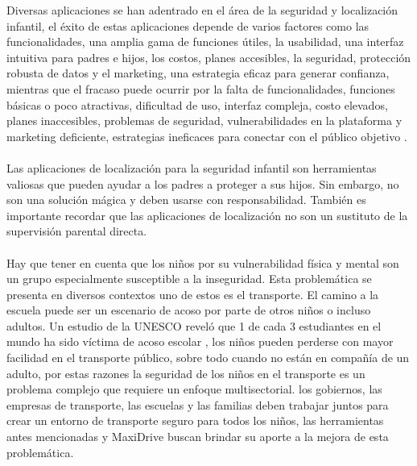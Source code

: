 \documentclass[12pt,onehalfspacing]{report}
\begin{document}
Diversas aplicaciones se han adentrado en el área de la seguridad y localización infantil, el éxito de estas aplicaciones depende de varios factores como las funcionalidades, una amplia gama de funciones útiles, la usabilidad, una interfaz intuitiva para padres e hijos, los costos, planes accesibles, la seguridad, protección robusta de datos y el marketing, una estrategia eficaz para generar confianza, mientras que el fracaso puede ocurrir por la falta de funcionalidades, funciones básicas o poco atractivas, dificultad de uso, interfaz compleja, costo elevados, planes inaccesibles, problemas de seguridad, vulnerabilidades en la plataforma y marketing deficiente, estrategias ineficaces para conectar con el público objetivo \cite{child_safety}.\\\\
Las aplicaciones de localización para la seguridad infantil son herramientas valiosas que pueden ayudar a los padres a proteger a sus hijos. Sin embargo, no son una solución mágica y deben usarse con responsabilidad. También es importante recordar que las aplicaciones de localización no son un sustituto de la supervisión parental directa.\\\\
Hay que tener en cuenta que los niños por su vulnerabilidad física y mental son un grupo especialmente susceptible a la inseguridad. Esta problemática se presenta en diversos contextos uno de estos es el transporte. El camino a la escuela puede ser un escenario de acoso por parte de otros niños o incluso adultos. Un estudio de la UNESCO reveló que 1 de cada 3 estudiantes en el mundo ha sido víctima de acoso escolar \cite{unesco_bullying}, los niños pueden perderse con mayor facilidad en el transporte público, sobre todo cuando no están en compañía de un adulto, por estas razones la seguridad de los niños en el transporte es un problema complejo que requiere un enfoque multisectorial. los gobiernos, las empresas de transporte, las escuelas y las familias deben trabajar juntos para crear un entorno de transporte seguro para todos los niños, las herramientas antes mencionadas y MaxiDrive buscan brindar su aporte a la mejora de esta problemática.
\end{document}
